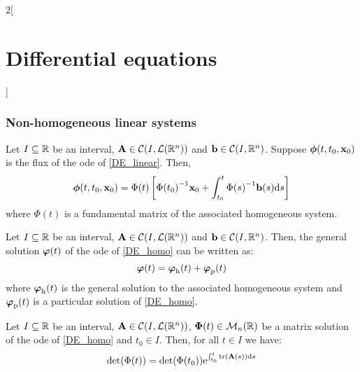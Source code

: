 \documentclass[../../../main.tex]{subfiles}
\begin{document}
\begin{multicols}{2}[\section{Differential equations}]
    \subsubsection{Non-homogeneous linear systems}
    \begin{prop}
        Let $I\subseteq \mathbb{R}$ be an interval, $\boldsymbol{\mathrm{A}}\in\mathcal{C}(I,\mathcal{L}(\mathbb{R}^n))$ and $\boldsymbol{\mathrm{b}}\in\mathcal{C}(I,\mathbb{R}^n)$. Suppose $\boldsymbol{\mathrm{\phi}}(t,t_0,\boldsymbol{\mathrm{x}}_0)$ is the flux of the ode of \cref{DE_linear}. Then, $$\boldsymbol{\mathrm{\phi}}(t,t_0,\boldsymbol{\mathrm{x}}_0)=\Phi(t)\left[{\Phi(t_0)}^{-1}\boldsymbol{\mathrm{x}}_0+\int_{t_0}^t{\Phi(s)}^{-1}\boldsymbol{\mathrm{b}}(s)\dd s\right]$$ where $\Phi(t)$ is a fundamental matrix of the associated homogeneous system.
    \end{prop}
    \begin{corollary}
        Let $I\subseteq \mathbb{R}$ be an interval, $\boldsymbol{\mathrm{A}}\in\mathcal{C}(I,\mathcal{L}(\mathbb{R}^n))$ and $\boldsymbol{\mathrm{b}}\in\mathcal{C}(I,\mathbb{R}^n)$. Then, the general solution $\boldsymbol{\mathrm{\varphi}}(t)$ of the ode of \cref{DE_homo} can be written as: $$\boldsymbol{\mathrm{\varphi}}(t)=\boldsymbol{\mathrm{\varphi}}_\mathrm{h}(t)+\boldsymbol{\mathrm{\varphi}}_\mathrm{p}(t)$$ where $\boldsymbol{\mathrm{\varphi}}_\mathrm{h}(t)$ is the general solution to the associated homogeneous system and $\boldsymbol{\mathrm{\varphi}}_\mathrm{p}(t)$ is a particular solution of \cref{DE_homo}.
    \end{corollary}
    \begin{prop}
        Let $I\subseteq \mathbb{R}$ be an interval, $\boldsymbol{\mathrm{A}}\in\mathcal{C}(I,\mathcal{L}(\mathbb{R}^n))$, $\boldsymbol{\mathrm{\Phi}}(t)\in\mathcal{M}_n(\mathbb{R})$ be a matrix solution of the ode of \cref{DE_homo} and $t_0\in I$. Then, for all $t\in I$ we have: $$\det(\Phi(t))=\det (\Phi(t_0))\exp{\int_{t_0}^t\trace(\vf{A}(s))\dd s}$$
    \end{prop}

\end{multicols}
\end{document}
